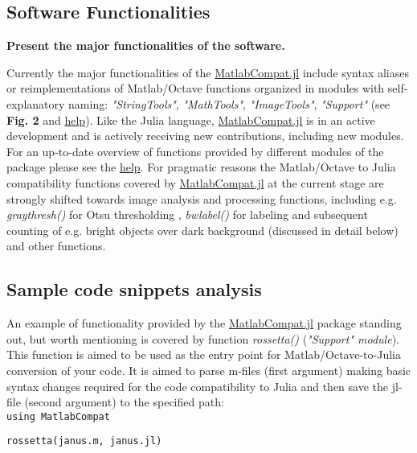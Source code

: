 \subsection{Software Functionalities}

\textbf{Present the major functionalities of the software.}

Currently the major functionalities of the \href{https://github.com/MatlabCompat/MatlabCompat.jl}{MatlabCompat.jl} include syntax aliases or reimplementations of Matlab/Octave functions organized in modules with self-explanatory naming: \textit{"StringTools"}, \textit{"MathTools"}, \textit{"ImageTools"}, \textit{"Support"} (see \textbf{Fig. 2} and \href{http://matlabcompat.github.io/help.html}{help}). Like the Julia language, \href{https://github.com/MatlabCompat/MatlabCompat.jl}{MatlabCompat.jl} is in an active development and is actively receiving new contributions, including new modules. For an up-to-date overview of functions provided by different modules of the package please see the \href{http://matlabcompat.github.io/help.html}{help}. For pragmatic reasons the Matlab/Octave to Julia compatibility functions covered by \href{https://github.com/MatlabCompat/MatlabCompat.jl}{MatlabCompat.jl} at the current stage are strongly shifted towards image analysis and processing functions, including e.g. \textit{graythresh()} for Otsu thresholding \cite{otsu1975threshold}, \textit{bwlabel()} for labeling and subsequent counting of e.g. bright objects over dark background (discussed in detail below) and other functions.

\subsection{Sample code snippets analysis}

An example of functionality provided by the \href{https://github.com/MatlabCompat/MatlabCompat.jl}{MatlabCompat.jl} package standing out, but worth mentioning is covered by function \textit{rossetta()} (\textit{"Support" module}). This function is aimed to be used as the entry point for Matlab/Octave-to-Julia conversion of your code. It is aimed to parse m-files (first argument) making basic syntax changes required for the code compatibility to Julia and then save the jl-file (second argument) to the specified path:\\

\verb|using MatlabCompat|

\verb|rossetta(janus.m, janus.jl)|\\

